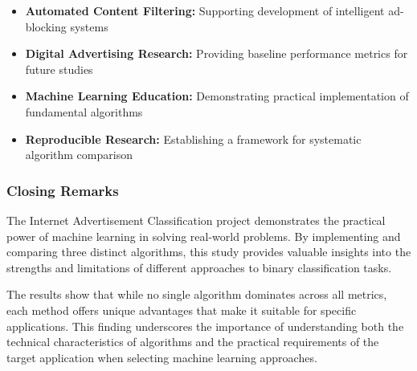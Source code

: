 \begin{itemize}
    \item \textbf{Automated Content Filtering:} Supporting development of intelligent ad-blocking systems
    \item \textbf{Digital Advertising Research:} Providing baseline performance metrics for future studies
    \item \textbf{Machine Learning Education:} Demonstrating practical implementation of fundamental algorithms
    \item \textbf{Reproducible Research:} Establishing a framework for systematic algorithm comparison
\end{itemize}

\subsubsection{Closing Remarks}

The Internet Advertisement Classification project demonstrates the practical power of machine learning in solving real-world problems. By implementing and comparing three distinct algorithms, this study provides valuable insights into the strengths and limitations of different approaches to binary classification tasks.

The results show that while no single algorithm dominates across all metrics, each method offers unique advantages that make it suitable for specific applications. This finding underscores the importance of understanding both the technical characteristics of algorithms and the practical requirements of the target application when selecting machine learning approaches.